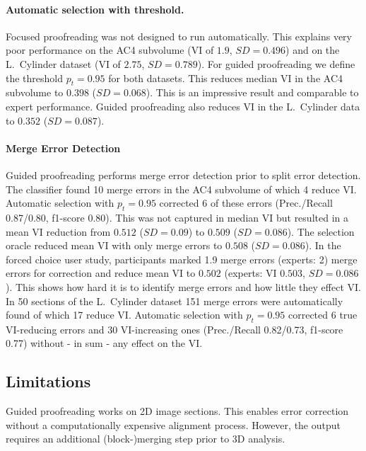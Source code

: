 \paragraph{Automatic selection with threshold.} Focused proofreading was not designed to run automatically. This explains very poor performance on the AC4 subvolume (VI of $1.9$, $SD=0.496$) and on the L.~Cylinder dataset (VI of $2.75$, $SD=0.789$). For guided proofreading we define the threshold $p_t=0.95$ for both datasets. This reduces median VI in the AC4 subvolume to $0.398$ ($SD=0.068$). This is an impressive result and comparable to expert performance. Guided proofreading also reduces VI in the L.~Cylinder data to $0.352$ ($SD=0.087$).

\paragraph{Merge Error Detection} Guided proofreading performs merge error detection prior to split error detection. The classifier found 10 merge errors in the AC4 subvolume of which 4 reduce VI. Automatic selection with $p_t=0.95$ corrected 6 of these errors (Prec./Recall 0.87/0.80, f1-score 0.80). This was not captured in median VI but resulted in a mean VI reduction from $0.512$ ($SD=0.09$) to $0.509$ ($SD=0.086$). The selection oracle reduced mean VI with only merge errors to $0.508$ ($SD=0.086$). In the forced choice user study, participants marked 1.9 merge errors (experts: 2) merge errors for correction and reduce mean VI to $0.502$ (experts: VI $0.503$, $SD=0.086$). This shows how hard it is to identify merge errors and how little they effect VI. In 50 sections of the L.~Cylinder dataset 151 merge errors were automatically found of which 17 reduce VI. Automatic selection with $p_t=0.95$ corrected 6 true VI-reducing errors and 30 VI-increasing ones (Prec./Recall 0.82/0.73, f1-score 0.77) without - in sum - any effect on the VI. 

\subsection{Limitations}
Guided proofreading works on 2D image sections. This enables error correction without a computationally expensive alignment process. However, the output requires an additional (block-)merging step prior to 3D  analysis.
